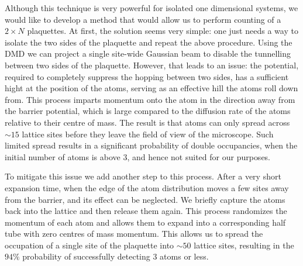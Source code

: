 Although this technique is very powerful for isolated one dimensional systems, we would like to develop a method that would allow us to perform counting of a $2\times N$ plaquettes. At first, the solution seems very simple: one just needs a way to isolate the two sides of the plaquette and repeat the above procedure. Using the DMD we can project a single site-wide Gaussian beam to disable the tunnelling between two sides of the plaquette. However, that leads to an issue: the potential, required to completely suppress the hopping between two sides, has a sufficient hight at the position of the atoms, serving as an effective hill the atoms roll down from. This process imparts momentum onto the atom in the direction away from the barrier potential, which is large compared to the diffusion rate of the atoms relative to their centre of mass. The result is that atoms can only spread across $\sim 15$ lattice sites before they leave the field of view of the microscope. Such limited spread results in a significant probability of double occupancies, when the initial number of atoms is above $3$, and hence not suited for our purposes.

To mitigate this issue we add another step to this process. After a very short expansion time, when the edge of the atom distribution moves a few sites away from the barrier, and its effect can be neglected. We briefly capture the atoms back into the lattice and then release them again. This process randomizes the momentum of each atom and allows them to expand into a corresponding half tube with zero centres of mass momentum. This allows us to spread the occupation of a single site of the plaquette into $\sim 50$ lattice sites, resulting in the $94\%$ probability of successfully detecting $3$ atoms or less.